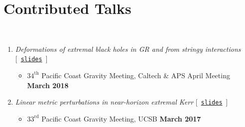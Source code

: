 
\section*{\sc Contributed Talks}~
\vspace{-.2in}

\begin{enumerate}

    \item {\it Deformations of extremal black holes in GR and from stringy interactions} \hfill
    [~\href{http://fermionic.me/talk-slides/Stringy%40PCGM.pdf}{{\tt slides}}~]
    \begin{itemize}
     \item[] $34^\mathrm{th}$ Pacific Coast Gravity Meeting, Caltech \& APS April Meeting 
       \hfill  {\bf March 2018} 
    \end{itemize}

    \item {\it Linear metric perturbations in near-horizon extremal Kerr} \hfill
    [~\href{http://fermionic.me/talk-slides/NHEK%40PCGM.pdf}{{\tt slides}}~]
    \begin{itemize}
     \item[] $33^\mathrm{rd}$ Pacific Coast Gravity Meeting, UCSB 
       \hfill  {\bf March 2017}
    \end{itemize}
    

\end{enumerate}
